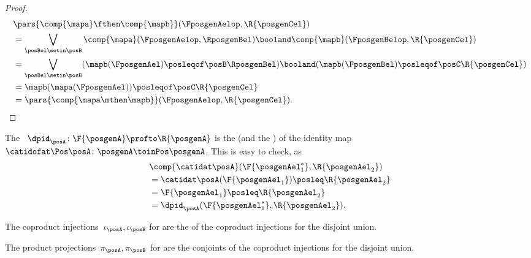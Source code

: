 \begin{proof}
\begin{equation}
        \begin{aligned}
            ~ & \pars{\comp{\mapa}\fthen \comp{\mapb}}(\FposgenAelop,\R{\posgenCel}) \\
              & =\bigvee_{\posBel\setin \posB} \comp{\mapa}(\FposgenAelop,\RposgenBel)\booland\comp{\mapb}(\FposgenBelop,\R{\posgenCel}) \\%
              & =\bigvee_{\posBel\setin \posB} (\mapb(\FposgenAel)\posleqof\posB \RposgenBel)\booland (\mapb(\FposgenBel)\posleqof\posC \R{\posgenCel}) \\
              & =\mapb(\mapa(\FposgenAel))\posleqof\posC \R{\posgenCel} \\
              & =\pars{\comp{\mapa\mthen \mapb}}(\FposgenAelop,\R{\posgenCel}).
        \end{aligned}
    \end{equation}
\end{proof}

\begin{example}
    The ~$\dpid_\posA\colon \F{\posgenA} \profto \R{\posgenA}$ is the  (and the ) of the identity map~$\catidofat\Pos\posA \colon \posgenA \toinPos \posgenA$.
    This is easy to check, as
    \begin{equation}
        \begin{aligned}
            ~ & \comp{\catidat\posA}(\F{\posgenAel_1^*},\R{\posgenAel_2}) \\
              & =\catidat\posA(\F{\posgenAel_1})\posleq \R{\posgenAel_2} \\
              & =\F{\posgenAel_1}\posleq \R{\posgenAel_2} \\
              & =\dpid_\posA(\F{\posgenAel_1^*},\R{\posgenAel_2}).
        \end{aligned}
    \end{equation}
\end{example}

\begin{example}
    The coproduct injections~$\iota_\posA, \iota_\posB$ for  are the  of the coproduct injections for the disjoint union.
\end{example}

\begin{example}
    The product projections~$\pi_\posA, \pi_\posB$ for  are the conjoints of the coproduct injections for the disjoint union.
\end{example}


